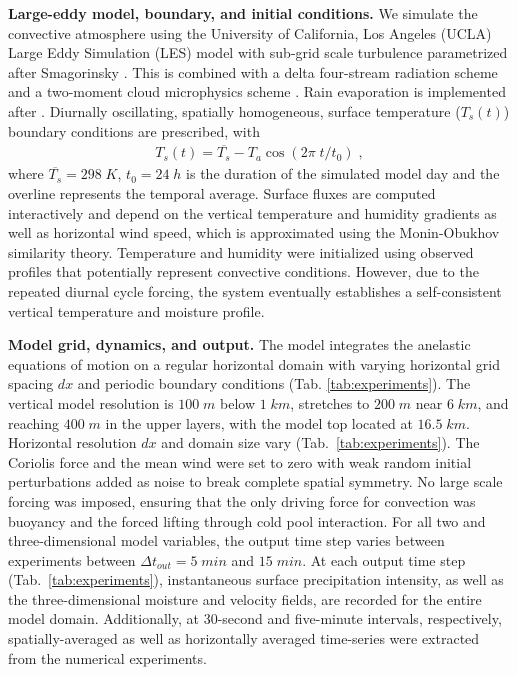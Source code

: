 \documentclass{article}
\begin{document}
\newpage
\clearpage
\begin{methods}
\noindent
{\bf Large-eddy model, boundary, and initial conditions.}
We simulate the convective atmosphere using the University of California, Los Angeles (UCLA) Large Eddy Simulation (LES) model with sub-grid scale turbulence parametrized after Smagorinsky \cite{smagorinsky1963general}.
This is combined with a delta four-stream radiation scheme \cite{pincus2009monte} and a two-moment cloud microphysics scheme \cite{stevens2005evaluation}. 
Rain evaporation is implemented after \citeauthor{seifert2006two} \citeyear{seifert2006two}.
Diurnally oscillating, spatially homogeneous, surface temperature ($T_s(t)$) boundary conditions are prescribed, with
\begin{eqnarray}
    T_s(t)=\overline{T_{s}}-T_{a} \cos{(2\pi\;t/t_0)}\;,
\end{eqnarray}
\noindent
where $\overline{T_{s}}=298\;K$, $t_0=24\;h$ is the duration of the simulated model day and the overline represents the temporal average.
Surface fluxes are computed interactively and depend on the vertical temperature and humidity gradients as well as horizontal wind speed, which is approximated using the Monin-Obukhov similarity theory.
Temperature and humidity were initialized using observed profiles that potentially represent convective conditions.
However, due to the repeated diurnal cycle forcing, the system eventually establishes a self-consistent vertical temperature and moisture profile.

\noindent
{\bf Model grid, dynamics, and output.}
The model integrates the anelastic equations of motion on a regular horizontal domain with varying horizontal grid spacing $dx$ and periodic boundary conditions (Tab. \ref{tab:experiments}). 
The vertical model resolution is $100\;m$ below $1\;km$, stretches to $200\;m$ near $6\;km$, and reaching $400\;m$ in the upper layers, with the model top located at $16.5\;km$.
Horizontal resolution $dx$ and domain size vary (Tab.~\ref{tab:experiments}). 
The Coriolis force and the mean wind were set to zero with weak random initial perturbations added as noise to break complete spatial symmetry. 
No large scale forcing was imposed, ensuring that the only driving force for convection was buoyancy and the forced lifting through cold pool interaction.
For all two and three-dimensional model variables, the output time step varies between experiments between $\Delta t_{out}=5\;min$ and $15\;min$. 
At each output time step (Tab.~\ref{tab:experiments}), instantaneous surface precipitation intensity, as well as the three-dimensional moisture and velocity fields, are recorded for the entire model domain. 
Additionally, at 30-second and five-minute intervals, respectively, spatially-averaged as well as horizontally averaged time-series were extracted from the numerical experiments.


\end{methods}
\end{document}
